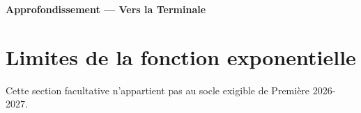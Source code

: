
\begin{center}\textbf{Approfondissement — Vers la Terminale}\end{center}
\section*{Limites de la fonction exponentielle}

Cette section facultative n'appartient pas au socle exigible de Première
2026-2027.


